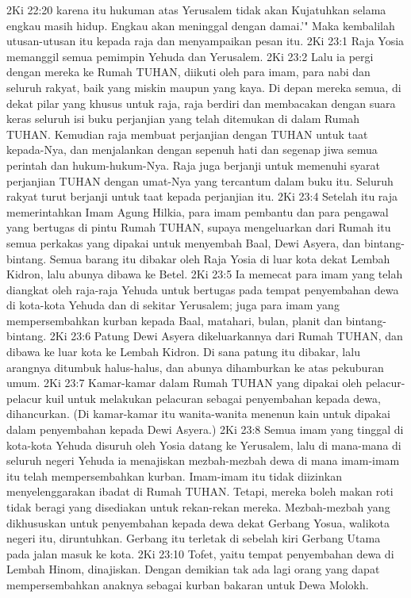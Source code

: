2Ki 22:20  karena itu hukuman atas Yerusalem tidak akan Kujatuhkan selama engkau masih hidup. Engkau akan meninggal dengan damai.'" Maka kembalilah utusan-utusan itu kepada raja dan menyampaikan pesan itu.
2Ki 23:1  Raja Yosia memanggil semua pemimpin Yehuda dan Yerusalem.
2Ki 23:2  Lalu ia pergi dengan mereka ke Rumah TUHAN, diikuti oleh para imam, para nabi dan seluruh rakyat, baik yang miskin maupun yang kaya. Di depan mereka semua, di dekat pilar yang khusus untuk raja, raja berdiri dan membacakan dengan suara keras seluruh isi buku perjanjian yang telah ditemukan di dalam Rumah TUHAN. Kemudian raja membuat perjanjian dengan TUHAN untuk taat kepada-Nya, dan menjalankan dengan sepenuh hati dan segenap jiwa semua perintah dan hukum-hukum-Nya. Raja juga berjanji untuk memenuhi syarat perjanjian TUHAN dengan umat-Nya yang tercantum dalam buku itu. Seluruh rakyat turut berjanji untuk taat kepada perjanjian itu.
2Ki 23:4  Setelah itu raja memerintahkan Imam Agung Hilkia, para imam pembantu dan para pengawal yang bertugas di pintu Rumah TUHAN, supaya mengeluarkan dari Rumah itu semua perkakas yang dipakai untuk menyembah Baal, Dewi Asyera, dan bintang-bintang. Semua barang itu dibakar oleh Raja Yosia di luar kota dekat Lembah Kidron, lalu abunya dibawa ke Betel.
2Ki 23:5  Ia memecat para imam yang telah diangkat oleh raja-raja Yehuda untuk bertugas pada tempat penyembahan dewa di kota-kota Yehuda dan di sekitar Yerusalem; juga para imam yang mempersembahkan kurban kepada Baal, matahari, bulan, planit dan bintang-bintang.
2Ki 23:6  Patung Dewi Asyera dikeluarkannya dari Rumah TUHAN, dan dibawa ke luar kota ke Lembah Kidron. Di sana patung itu dibakar, lalu arangnya ditumbuk halus-halus, dan abunya dihamburkan ke atas pekuburan umum.
2Ki 23:7  Kamar-kamar dalam Rumah TUHAN yang dipakai oleh pelacur-pelacur kuil untuk melakukan pelacuran sebagai penyembahan kepada dewa, dihancurkan. (Di kamar-kamar itu wanita-wanita menenun kain untuk dipakai dalam penyembahan kepada Dewi Asyera.)
2Ki 23:8  Semua imam yang tinggal di kota-kota Yehuda disuruh oleh Yosia datang ke Yerusalem, lalu di mana-mana di seluruh negeri Yehuda ia menajiskan mezbah-mezbah dewa di mana imam-imam itu telah mempersembahkan kurban. Imam-imam itu tidak diizinkan menyelenggarakan ibadat di Rumah TUHAN. Tetapi, mereka boleh makan roti tidak beragi yang disediakan untuk rekan-rekan mereka. Mezbah-mezbah yang dikhususkan untuk penyembahan kepada dewa dekat Gerbang Yosua, walikota negeri itu, diruntuhkan. Gerbang itu terletak di sebelah kiri Gerbang Utama pada jalan masuk ke kota.
2Ki 23:10  Tofet, yaitu tempat penyembahan dewa di Lembah Hinom, dinajiskan. Dengan demikian tak ada lagi orang yang dapat mempersembahkan anaknya sebagai kurban bakaran untuk Dewa Molokh.
